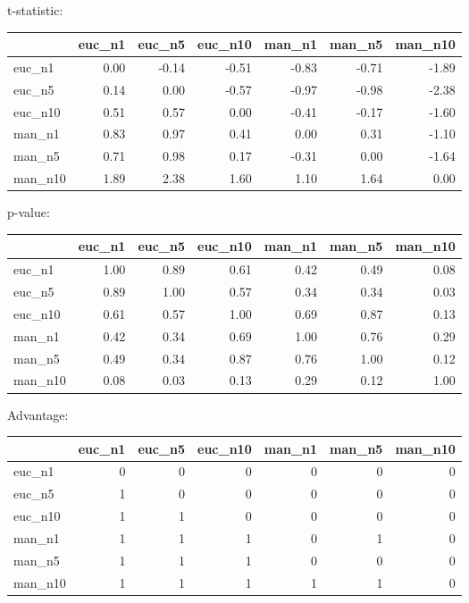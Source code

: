 t-statistic:
 \begin{tabular}{lrrrrrr}
\hline
         &   euc\_n1 &   euc\_n5 &   euc\_n10 &   man\_n1 &   man\_n5 &   man\_n10 \\
\hline
 euc\_n1  &     0.00 &    -0.14 &     -0.51 &    -0.83 &    -0.71 &     -1.89 \\
 euc\_n5  &     0.14 &     0.00 &     -0.57 &    -0.97 &    -0.98 &     -2.38 \\
 euc\_n10 &     0.51 &     0.57 &      0.00 &    -0.41 &    -0.17 &     -1.60 \\
 man\_n1  &     0.83 &     0.97 &      0.41 &     0.00 &     0.31 &     -1.10 \\
 man\_n5  &     0.71 &     0.98 &      0.17 &    -0.31 &     0.00 &     -1.64 \\
 man\_n10 &     1.89 &     2.38 &      1.60 &     1.10 &     1.64 &      0.00 \\
\hline
\end{tabular} 

p-value:
 \begin{tabular}{lrrrrrr}
\hline
         &   euc\_n1 &   euc\_n5 &   euc\_n10 &   man\_n1 &   man\_n5 &   man\_n10 \\
\hline
 euc\_n1  &     1.00 &     0.89 &      0.61 &     0.42 &     0.49 &      0.08 \\
 euc\_n5  &     0.89 &     1.00 &      0.57 &     0.34 &     0.34 &      0.03 \\
 euc\_n10 &     0.61 &     0.57 &      1.00 &     0.69 &     0.87 &      0.13 \\
 man\_n1  &     0.42 &     0.34 &      0.69 &     1.00 &     0.76 &      0.29 \\
 man\_n5  &     0.49 &     0.34 &      0.87 &     0.76 &     1.00 &      0.12 \\
 man\_n10 &     0.08 &     0.03 &      0.13 &     0.29 &     0.12 &      1.00 \\
\hline
\end{tabular} 

Advantage:
 \begin{tabular}{lrrrrrr}
\hline
         &   euc\_n1 &   euc\_n5 &   euc\_n10 &   man\_n1 &   man\_n5 &   man\_n10 \\
\hline
 euc\_n1  &        0 &        0 &         0 &        0 &        0 &         0 \\
 euc\_n5  &        1 &        0 &         0 &        0 &        0 &         0 \\
 euc\_n10 &        1 &        1 &         0 &        0 &        0 &         0 \\
 man\_n1  &        1 &        1 &         1 &        0 &        1 &         0 \\
 man\_n5  &        1 &        1 &         1 &        0 &        0 &         0 \\
 man\_n10 &        1 &        1 &         1 &        1 &        1 &         0 \\
\hline
\end{tabular} 

